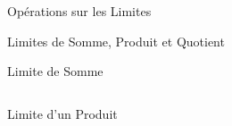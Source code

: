 \documentclass{coursbook}
\begin{document}
\begin{Gpartie}{Opérations sur les Limites}
\begin{Spartie}{Limites de Somme, Produit et Quotient}
\begin{SSpartie}{Limite de Somme}
\begin{table}[H]
{\begin{tabular}{ p{0.15\linewidth} *{3}{M{0.17\linewidth}} }
                        \end{tabular}
                    }
                \end{table}
            \end{SSpartie}
            \pagebreak
            \begin{SSpartie}{Limite d'un Produit} 
                \begin{table}[H]
                    \centering {}
\end{table}
\end{SSpartie}
\end{Spartie}
\end{Gpartie}
\end{document}
